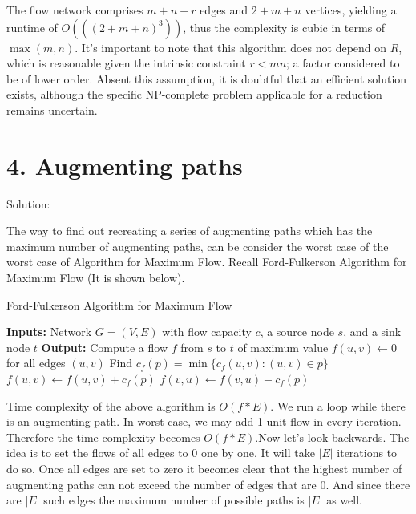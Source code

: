 \documentclass{article}
\begin{document}
\begin{enumerate}
    The flow network comprises $m + n + r$ edges and $2 + m + n$ vertices, yielding a runtime of $O(((2 + m + n)^3))$, thus the complexity is cubic in terms of $\max(m, n)$. It's important to note that this algorithm does not depend on $R$, which is reasonable given the intrinsic constraint $r < mn$; a factor considered to be of lower order. Absent this assumption, it is doubtful that an efficient solution exists, although the specific NP-complete problem applicable for a reduction remains uncertain.

\end{enumerate}

\section*{4. Augmenting paths}
Solution:

The way to find out recreating a series of augmenting paths which has the maximum number of augmenting paths, can be consider the worst case of the worst case of Algorithm for Maximum Flow. Recall Ford-Fulkerson Algorithm for Maximum Flow (It is shown below).
\begin{algorithm}
\caption{Ford-Fulkerson Algorithm for Maximum Flow}
\begin{algorithmic}[1]
\State \textbf{Inputs:} Network $G = (V, E)$ with flow capacity $c$, a source node $s$, and a sink node $t$
\State \textbf{Output:} Compute a flow $f$ from $s$ to $t$ of maximum value
\State $f(u, v) \gets 0$ for all edges $(u, v)$
    \State Find $c_f(p) = \min\{c_f(u, v) : (u, v) \in p\}$
        \State $f(u, v) \gets f(u, v) + c_f(p)$ 
        \State $f(v, u) \gets f(v, u) - c_f(p)$ 
    \EndFor
\EndWhile
\end{algorithmic}
\end{algorithm}

Time complexity of the above algorithm is $O(f * E)$. We run a loop while there is an augmenting path. In worst case, we may add 1 unit flow in every iteration. Therefore the time complexity becomes $O(f * E)$.Now let's look backwards. The idea is to set the flows of all edges to 0 one by one. It will take $|E|$ iterations to do so. Once all edges are set to zero it becomes clear that the highest number of augmenting paths can not exceed the number of edges that are 0. And since there are $|E|$ such edges the maximum number of possible paths is $|E|$ as well.
\end{document}
